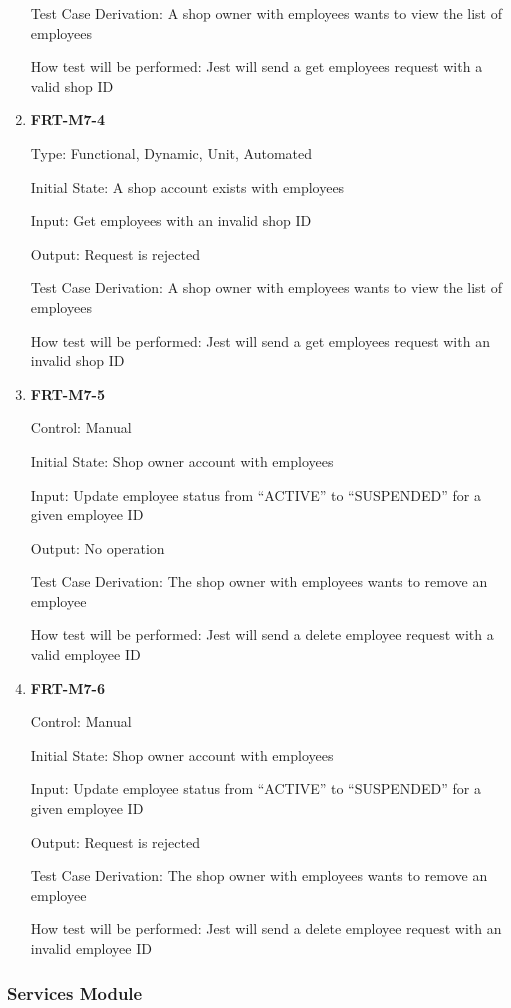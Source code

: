 \documentclass[12pt, titlepage]{article}
\begin{document}
\begin{enumerate}
	      Test Case Derivation: A shop owner with employees wants to view the list of employees

	      How test will be performed: Jest will send a get employees request with a valid shop ID

	\item \textbf{FRT-M7-4}

	      Type: Functional, Dynamic, Unit, Automated

	      Initial State: A shop account exists with employees

	      Input: Get employees with an invalid shop ID

	      Output: Request is rejected

	      Test Case Derivation: A shop owner with employees wants to view the list of employees

	      How test will be performed: Jest will send a get employees request with an invalid shop ID

	\item \textbf{FRT-M7-5}

	      Control: Manual

	      Initial State: Shop owner account with employees

	      Input: Update employee status from ``ACTIVE'' to ``SUSPENDED'' for a given employee ID

	      Output: No operation

	      Test Case Derivation: The shop owner with employees wants to remove an employee

	      How test will be performed: Jest will send a delete employee request with a valid employee ID

	\item \textbf{FRT-M7-6}

	      Control: Manual

	      Initial State: Shop owner account with employees

	      Input: Update employee status from ``ACTIVE'' to ``SUSPENDED'' for a given employee ID

	      Output: Request is rejected

	      Test Case Derivation: The shop owner with employees wants to remove an employee

	      How test will be performed: Jest will send a delete employee request with an invalid employee ID

\end{enumerate}

\subsubsection{Services Module}
\end{document}
